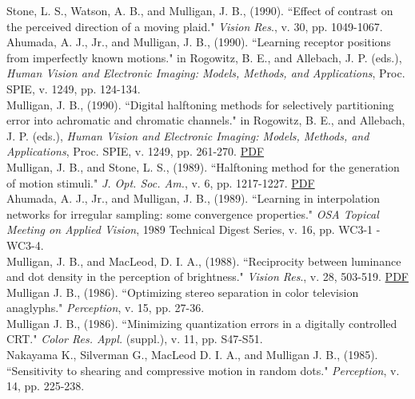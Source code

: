 \documentclass[12pt]{article}
\newcommand{\years}[1]{\marginnote{\scriptsize #1}}
\begin{document}
\years{1990}
Stone, L. S., Watson, A. B., and Mulligan, J. B., (1990).
``Effect of contrast on the perceived direction of a moving plaid."
\emph{Vision Res}., v. 30, pp. 1049-1067.\\

Ahumada, A. J., Jr., and Mulligan, J. B., (1990).
``Learning receptor positions from imperfectly known motions."
in Rogowitz, B. E., and Allebach, J. P. (eds.),
\emph{Human Vision and Electronic Imaging:  Models, Methods, and Applications},
Proc. SPIE, v. 1249,
pp. 124-134.\\

Mulligan, J. B., (1990).
``Digital halftoning methods for selectively partitioning
error into achromatic and chromatic channels."
in Rogowitz, B. E., and Allebach, J. P. (eds.),
\emph{Human Vision and Electronic Imaging:  Models, Methods, and Applications},
Proc. SPIE, v. 1249,
pp. 261-270.  \href{http://scanpath.arc.nasa.gov/pub_files/spie90.pdf}{PDF}\\

\years{1989}
Mulligan, J. B., and Stone, L. S., (1989).
``Halftoning method for the generation of motion stimuli."
\emph{J. Opt. Soc. Am.}, v. 6, pp. 1217-1227.  \href{http://scanpath.arc.nasa.gov/pub_files/josa89.pdf}{PDF}\\

Ahumada, A. J., Jr., and Mulligan, J. B., (1989).
``Learning in interpolation networks for irregular sampling: some convergence properties."
\emph{OSA Topical Meeting on Applied Vision},
1989 Technical Digest Series,  v. 16, pp. WC3-1 - WC3-4.\\

\years{1988}
Mulligan, J. B., and MacLeod, D. I. A., (1988).
``Reciprocity between luminance and dot density in the perception of brightness."
\emph{Vision Res}., v. 28, 503-519.  \href{http://scanpath.arc.nasa.gov/pub_files/vr88.pdf}{PDF}\\

\years{1986}
Mulligan J. B., (1986).
``Optimizing stereo separation in color television anaglyphs."
\emph{Perception}, v. 15, pp. 27-36.\\

Mulligan J. B., (1986).
``Minimizing quantization errors in a digitally controlled CRT."
\emph{Color Res. Appl.} (suppl.), v. 11, pp. S47-S51.\\

\years{1985}
Nakayama K., Silverman G., MacLeod D. I. A., and Mulligan J. B., (1985).
``Sensitivity to shearing and compressive motion in random dots."
\emph{Perception}, v. 14, pp. 225-238.\\
\end{document}
